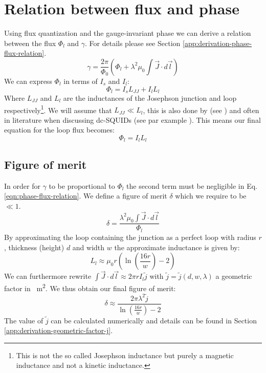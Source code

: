 \section{Relation between flux and phase}
Using flux quantization and the gauge-invariant phase we can derive a relation between the flux $\Phi_l$ and $\gamma$. For details please see Section \ref{app:derivation-phase-flux-relation}.
\begin{equation}
	\gamma = \frac{2\pi}{\Phi_0}\left(\Phi_l + \lambda^2\mu_0 \int \vec{J}\cdot d \vec{l} \right)
	\label{eqn:phase-flux-relation}
\end{equation}
We can express $\Phi_l$ in terms of $I_s$ and $I_l$:
\begin{equation}
	\Phi_l = I_sL_{JJ}  + I_lL_l
\end{equation}
Where $L_{JJ}$ and $L_l$ are the inductances of the Josephson junction and loop respectively\footnote{This is not the so called Josephson inductance but purely a magnetic inductance and not a kinetic inductance.}. We will assume that $L_{JJ} \ll L_l$, this is also done by \citeauthor{frolovMeasurementCurrentPhaseRelation2004} (see \cite{frolovCurrentphaseRelationsJosephson2005,frolovMeasurementCurrentPhaseRelation2004}) and often in literature when discussing dc-SQUIDs (see par example \cite{clarkeSQUIDHandbook2004}). This means our final equation for the loop flux becomes:
\begin{equation}
	\Phi_l = I_lL_l
\end{equation}

\subsection{Figure of merit}
\label{sec:figure-of-merit}
In order for $\gamma$ to be proportional to $\Phi_l$ the second term must be negligible in Eq. \ref{eqn:phase-flux-relation}. We define a figure of merit $\delta$ which we require to be $\ll 1$.
\begin{equation}
	\delta = \frac{\lambda^2\mu_0 \int \vec{J}\cdot d \vec{l}}{\Phi_l}
\end{equation}
By approximating the loop containing the junction as a perfect loop with radius $r$, thickness (height) $d$ and width $w$ the approximate inductance is given by\cite{eewebCoilInductanceCalculator}:
\begin{equation}
	L_l \approx \mu_0 r \left( \ln\left(\frac{16r}{w}\right) - 2\right)
	\label{eq:loop-inductance}
\end{equation}
We can furthermore rewrite $\int \vec{J} \cdot d \vec{l} \approx 2\pi r I_l \tilde{j}$ with $\tilde{j} = \tilde{j}(d, w, \lambda)$ a geometric factor in \unit{\per\square\meter}. We thus obtain our final figure of merit:
\begin{equation}
	\delta \approx \frac{2\pi \lambda^2 \tilde{j}}{\ln\left(\frac{16r}{w}\right) - 2}
	\label{eqn:figure-of-merit}
\end{equation}
The value of $\tilde{j}$ can be calculated numerically and details can be found in Section \ref{app:derivation-geometric-factor-j}.

